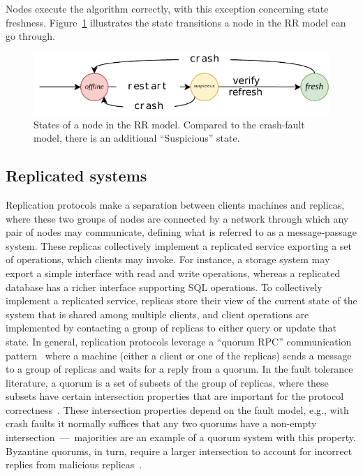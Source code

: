 Nodes execute the algorithm correctly, with this exception
concerning state freshness. Figure~\ref{fig:states} illustrates
the state transitions a node in the \ac{RR} model can go through.

\begin{figure}[t]
    \centering
    \includegraphics[width=\linewidth]{img/RR_states}
    \caption{States of a node in the \ac{RR} model. Compared
      to the crash-fault model, there is an additional ``Suspicious''
      state.}\label{fig:states}
\end{figure}

\subsection{Replicated systems}\label{ssec:sys_model}

Replication protocols make a separation between clients machines
and replicas, where these two groups of nodes are connected by a
network through which any pair of nodes may communicate, defining
what is referred to as a message-passage system. These replicas
collectively implement a replicated service exporting a set of
operations, which clients may invoke. For instance, a storage
system may export a simple interface with read and write
operations, whereas a replicated database has a richer interface
supporting SQL operations. To collectively implement a replicated
service, replicas store their view of the current state of the
system that is shared among multiple clients, and client
operations are implemented by contacting a group of replicas to
either query or update that state. In general, replication
protocols leverage a ``quorum RPC'' communication
pattern~\cite{Malkhi:Reiter:BQS:98,lorenzo:framework} where a
machine (either a client or one of the replicas) sends a message
to a group of replicas and waits for a reply from a quorum. In
the fault tolerance literature, a quorum is a set of subsets of
the group of replicas, where these subsets have certain
intersection properties that are important for the protocol
correctness~\cite{gifford:quorums}. These intersection properties
depend on the fault model, e.g., with crash faults it normally
suffices that any two quorums have a non-empty
intersection~---~majorities are an example of a quorum system
with this property. Byzantine quorums, in turn, require a larger
intersection to account for incorrect replies from malicious
replicas~\cite{Malkhi:Reiter:BQS:98}.

